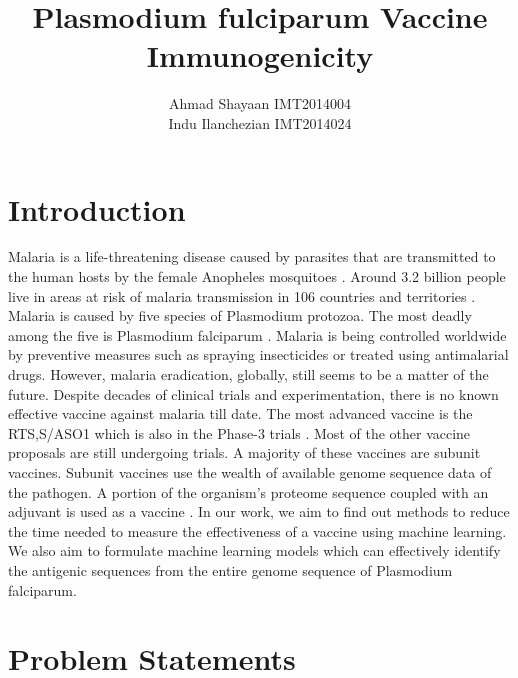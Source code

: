 \documentclass[notitlepage]{article}
\title{Plasmodium fulciparum Vaccine Immunogenicity}
\author{Ahmad Shayaan IMT2014004 \\ Indu Ilanchezian IMT2014024}
\begin{document}
	\maketitle
	
	\section{Introduction}
	Malaria is a life-threatening disease caused by parasites that are transmitted to the human hosts by the female Anopheles mosquitoes \cite{item0}. Around 3.2 billion people live in areas at risk of malaria transmission in 106 countries and territories \cite{item01}. Malaria is caused by five species of Plasmodium protozoa. The most deadly among the five is Plasmodium falciparum \cite{item0}. 
	Malaria is being controlled worldwide by preventive measures such as spraying insecticides or treated using antimalarial drugs. However, malaria eradication, globally, still seems to be a matter of the future. Despite decades of clinical trials and experimentation, there is no known effective vaccine against malaria till date. The most advanced vaccine is the RTS,S/ASO1 which is also in the Phase-3 trials \cite{item02}. Most of the other vaccine proposals are still undergoing trials. A majority of these vaccines are subunit vaccines. Subunit vaccines use the wealth of available genome sequence data of the pathogen. A portion of the organism's proteome sequence coupled with an adjuvant is used as a vaccine \cite{item6}. In our work, we aim to find out methods to reduce the time needed to measure the effectiveness of a vaccine using machine learning. We also aim to formulate machine learning models which can effectively identify the antigenic sequences from the entire genome sequence of Plasmodium falciparum. 
	
	\section{Problem Statements}
\end{document}
